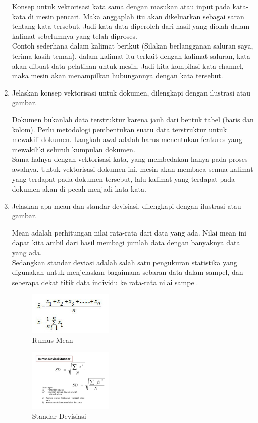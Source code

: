 \begin{enumerate}
Konsep untuk vektorisasi kata sama dengan masukan atau input pada kata-kata di mesin
pencari. Maka anggaplah itu akan dikeluarkan sebagai saran tentang kata tersebut. Jadi
kata data diperoleh dari hasil yang diolah dalam kalimat sebelumnya yang telah
diproses. \\
Contoh sederhana dalam kalimat berikut (Silakan berlangganan saluran saya,
terima kasih teman), dalam kalimat itu terkait dengan kalimat saluran, kata akan dibuat
data pelatihan untuk mesin. Jadi kita kompilasi kata channel, maka mesin akan
menampilkan hubungannya dengan kata tersebut.

\item Jelaskan konsep vektorisasi untuk dokumen, dilengkapi dengan ilustrasi atau gambar.

Dokumen bukanlah data terstruktur karena jauh dari bentuk tabel (baris dan kolom).
Perlu metodologi pembentukan suatu data terstruktur untuk mewakili dokumen.
Langkah awal adalah harus menentukan features yang mewakiliki seluruh kumpulan
dokumen.\\
Sama halnya dengan vektorisasi kata, yang membedakan hanya pada proses awalnya.
Untuk vektorisasi dokumen ini, mesin akan membaca semua kalimat yang terdapat
pada dokumen tersebut, lalu kalimat yang terdapat pada dokumen akan di pecah
menjadi kata-kata.

\item Jelaskan apa mean dan standar devisiasi, dilengkapi dengan ilustrasi atau gambar.

Mean adalah perhitungan nilai rata-rata dari data yang ada. Nilai mean ini dapat kita
ambil dari hasil membagi jumlah data dengan banyaknya data yang ada.\\
Sedangkan standar deviasi adalah salah satu pengukuran statistika yang digunakan
untuk menjelaskan bagaimana sebaran data dalam sampel, dan seberapa dekat titik data
individu ke rata-rata nilai sampel.

\begin{figure}
	\includegraphics[width=4cm]{figures/1174062/5/teori51.png}
	\centering
	\caption{Rumus Mean}
\end{figure}


\begin{figure}
	\includegraphics[width=4cm]{figures/1174062/5/teori52.png}
	\centering
	\caption{Standar Devisiasi}
\end{figure}


\end{enumerate}
